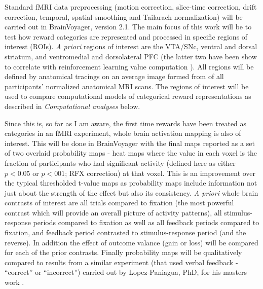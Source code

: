\documentclass[doc,12pt]{apa}        %
\begin{document}
Standard fMRI data preprocessing (motion correction, slice-time correction, drift correction, temporal, spatial smoothing and Tailarach normalization) will be carried out in BrainVoyager, version 2.1.  The main focus of this work will be to test how reward categories are represented and processed in specific regions of interest (ROIs).  \emph{A priori} regions of interest are the VTA/SNc, ventral and dorsal striatum, and ventromedial and dorsolateral PFC (the latter two have been show to correlate with reinforcement learning value computation ).  All regions will be defined by anatomical tracings on an average image formed from of all participants' normalized anatomical MRI scans.  The regions of interest will be used to compare computational models of categorical reward representations as described in \emph{Computational analyses} below.

Since this is, so far as I am aware, the first time rewards have been treated as categories in an fMRI experiment, whole brain activation mapping is also of interest.  This will be done in BrainVoyager with the final maps reported as a set of two overlaid probability maps - heat maps where the value in each voxel is the fraction of participants who had significant activity (defined here as either $p < 0.05$ or $p < 001$; RFX correction) at that voxel.   This is an improvement over the typical thresholded t-value maps as probability maps include information not just about the strength of the effect but also its consistency.  \emph{A priori} whole brain contrasts of interest are all trials compared to fixation (the most powerful contrast which will provide an overall picture of activity patterns), all stimulus-response periods compared to fixation as well as all feedback periods compared to fixation, and feedback period contrasted to stimulus-response period (and the reverse). In addition the effect of outcome valance (gain or loss) will be compared for each of the prior contrasts.  Finally probability maps will be qualitatively compared to results from a similar experiment (that used verbal feedback - ``correct'' or ``incorrect'') carried out by Lopez-Paniagua, PhD, for his masters work \cite{LopezPaniagua:2011p8296}. 
\end{document}
